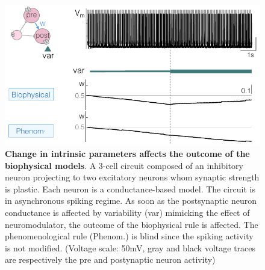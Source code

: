 \begin{figure}[H]
    \centering
\includegraphics[scale=1]{fig/Review/fig_part3_intrinsic.pdf}
    \caption{\textbf{Change in intrinsic parameters affects the outcome of the biophysical models}. A 3-cell circuit composed of an inhibitory neuron projecting to two excitatory neurons whom synaptic strength is plastic. Each neuron is a conductance-based model. The circuit is in asynchronous spiking regime. As soon as the postsynaptic neuron conductance is affected by variability (var) mimicking the effect of neuromodulator, the outcome of the biophysical rule is affected. The phenomenological rule (Phenom.) is blind since the spiking activity is not modified. (Voltage scale: 50mV, gray and black voltage traces are respectively the pre and postynaptic neuron activity) }
    \label{fig:intrinsic}
\end{figure}

%
%
